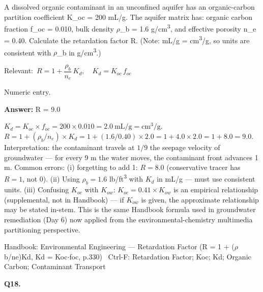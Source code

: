 \documentclass[11pt]{article}
\begin{document}
A dissolved organic contaminant in an unconfined aquifer has an organic-carbon partition coefficient K\_oc = 200 mL/g. The aquifer matrix has: organic carbon fraction f\_oc = 0.010, bulk density $\rho$\_b = 1.6 g/cm\textsuperscript{3}, and effective porosity n\_e = 0.40. Calculate the retardation factor R. (Note: mL/g = cm\textsuperscript{3}/g, so units are consistent with $\rho$\_b in g/cm\textsuperscript{3}.)\par\vspace{3pt}
{\small\color{soft}Relevant:}\ $R = 1 + \dfrac{\rho_b}{n_e}\,K_d,\quad K_d = K_{oc}\,f_{oc}$\par\vspace{3pt}
{\small\color{soft}Numeric entry.}\par\vspace{3pt}
\vspace{2pt}\par\noindent\colorbox{boxbg}{\parbox{\dimexpr\linewidth-2\fboxsep\relax}{%
\vspace{2pt}\textbf{Answer:} R = 9.0\par\vspace{2pt}
{\small $K_d = K_{oc}\times f_{oc} = 200\times0.010 = 2.0\ \mathrm{mL/g = cm^3/g}$. $R = 1 + (\rho_b/n_e)\times K_d = 1 + (1.6/0.40)\times2.0 = 1 + 4.0\times2.0 = 1 + 8.0 = 9.0$. Interpretation: the contaminant travels at $1/9$ the seepage velocity of groundwater --- for every 9 m the water moves, the contaminant front advances 1 m. Common errors: (i) forgetting to add 1: $R = 8.0$ (conservative tracer has $R=1$, not 0). (ii) Using $\rho_b = 1.6$ lb/ft\textsuperscript{3} with $K_d$ in mL/g --- must use consistent units. (iii) Confusing $K_{oc}$ with $K_{ow}$: $K_{oc} = 0.41\times K_{ow}$ is an empirical relationship (supplemental, not in Handbook) --- if $K_{ow}$ is given, the approximate relationship may be stated in-stem. This is the same Handbook formula used in groundwater remediation (Day 6) now applied from the environmental-chemistry multimedia partitioning perspective.}\par\vspace{2pt}
{\footnotesize\color{soft}Handbook: Environmental Engineering --- Retardation Factor (R = 1 + ($\rho$b/ne)Kd, Kd = Koc$\cdot$foc, p.330) \textbullet\ Ctrl-F: Retardation Factor; Koc; Kd; Organic Carbon; Contaminant Transport}\vspace{2pt}
}}
\vspace{9pt}
\filbreak
\textbf{\color{accent}Q18.}\par\vspace{2pt}
\end{document}
